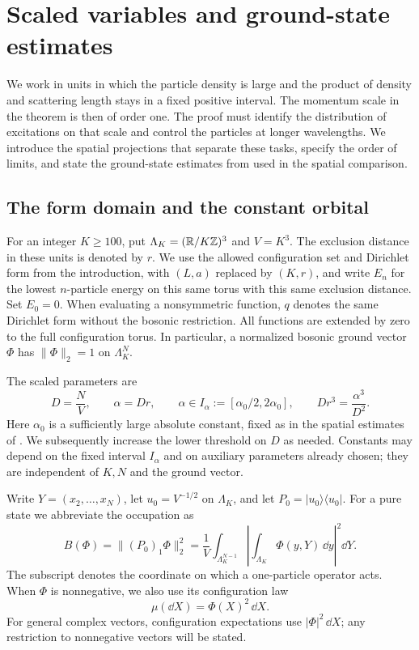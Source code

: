 \section{Scaled variables and ground-state estimates}\label{set:section}\label{sec:setup}

We work in units in which the particle density is large and the product
of density and scattering length stays in a fixed positive interval.
The momentum scale in the theorem is then of order one. The proof must
identify the distribution of excitations on that scale and control the
particles at longer wavelengths. We introduce the spatial projections
that separate these tasks, specify the order of limits, and state the
ground-state estimates from \cite{H} used in the spatial comparison.

\subsection{The form domain and the constant orbital}

For an integer $K\ge100$, put $\Lambda_K=(\mathbb R/K\mathbb Z)^3$ and $V=K^3$.
The exclusion distance in these units is denoted by $r$.
We use the allowed configuration set and Dirichlet form from the
introduction, with $(L,a)$ replaced by $(K,r)$, and write $E_n$ for the
lowest $n$-particle energy on this same torus with this same exclusion
distance. Set $E_0=0$. When evaluating a nonsymmetric function, $q$
denotes the same Dirichlet form without the bosonic restriction.
All functions are extended by zero to the full configuration torus.
In particular, a normalized bosonic ground vector
$\Phi$ has $\|\Phi\|_2=1$ on $\Lambda_K^N$.

The scaled parameters are
\begin{equation}\label{set:scales}
 D=\frac NV,\qquad \alpha=Dr,\qquad
 \alpha\in I_\alpha:=[\alpha_0/2,2\alpha_0],\qquad
 Dr^3=\frac{\alpha^3}{D^2}.
\end{equation}
Here $\alpha_0$ is a sufficiently large absolute constant, fixed as in
the spatial estimates of \cite{H}. We subsequently increase the lower
threshold on $D$ as needed. Constants may depend on the fixed interval
$I_\alpha$ and on auxiliary parameters already chosen; they are
independent of $K,N$ and the ground vector.

Write $Y=(x_2,\ldots,x_N)$, let $u_0=V^{-1/2}$ on $\Lambda_K$, and
let $P_0=|u_0\rangle\langle u_0|$. For a pure state we abbreviate the
occupation as
\begin{equation}\label{set:occupation}
 B(\Phi)=\|(P_0)_1\Phi\|_2^2
   =\frac1V\int_{\Lambda_K^{N-1}}
       \left|\int_{\Lambda_K}\Phi(y,Y)\,\dd y\right|^2\dd Y.
\end{equation}
The subscript denotes the coordinate on which a one-particle operator
acts. When $\Phi$ is nonnegative, we also use its configuration law
\begin{equation}\label{set:mu}
 \mu(\dd X)=\Phi(X)^2\,\dd X.
\end{equation}
For general complex vectors, configuration expectations use
$|\Phi|^2\,\dd X$; any restriction to nonnegative vectors will be stated.

